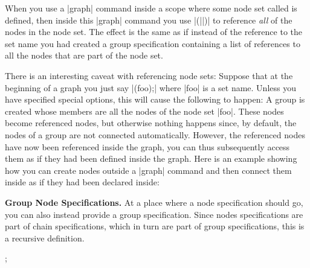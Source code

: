 When you use a |graph| command inside a scope where some node set called
 is defined, then inside this |graph| command you use
|(||)| to reference \emph{all} of the nodes in the node set. The
effect is the same as if instead of the reference to the set name you had
created a group specification containing a list of references to all the nodes
that are part of the node set.
%
\begin{codeexample}[]
\end{codeexample}

There is an interesting caveat with referencing node sets: Suppose that at the
beginning of a graph you just say |(foo);| where |foo| is a set name. Unless
you have specified special options, this will cause the following to happen: A
group is created whose members are all the nodes of the node set |foo|. These
nodes become referenced nodes, but otherwise nothing happens since, by default,
the nodes of a group are not connected automatically. However, the referenced
nodes have now been referenced inside the graph, you can thus subsequently
access them as if they had been defined inside the graph. Here is an example
showing how you can create nodes outside a |graph| command and then connect
them inside as if they had been declared inside:
%
\begin{codeexample}[]
\end{codeexample}

\medskip
\textbf{Group Node Specifications.} At a place where a node specification
should go, you can also instead provide a group specification. Since nodes
specifications are part of chain specifications, which in turn are part of
group specifications, this is a recursive definition.
%
\begin{codeexample}[]
\tikz {};
\end{codeexample}

